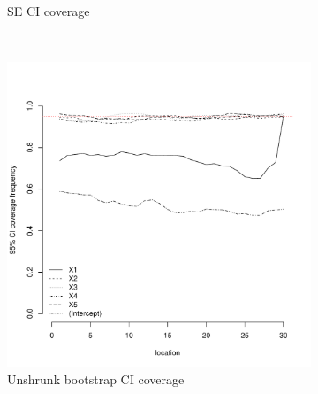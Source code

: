 \documentclass[authoryear, review, 11pt]{elsarticle}
\begin{document}
\begin{figure}
\begin{subfigure}[b]{0.45\textwidth}
		\caption{SE CI coverage}
	\end{subfigure}%
	\\%
	\begin{subfigure}[b]{0.45\textwidth}
	\centering
		\includegraphics[width=\textwidth]{../../figures/simulation/15.10.profile_unshrunk_bootstrap_coverage.pdf}
		\caption{Unshrunk bootstrap CI coverage}
	\end{subfigure}%
	~ %
	\begin{subfigure}[b]{0.45\textwidth}
	\centering

\end{subfigure}
\end{figure}
\end{document}
